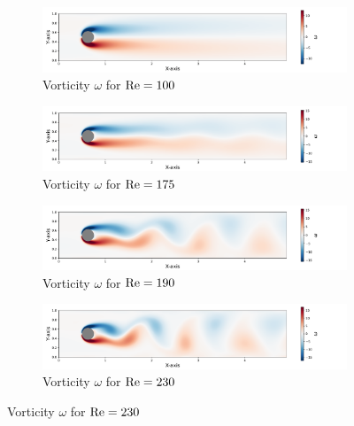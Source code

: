 \begin{figure}[!htb]
    \centering
    \hspace*{0.7cm}
    \begin{subfigure}[b]{\linewidth} %
        \includegraphics[width=\linewidth]{0_graphics/numeric/RE100_30_sim.pdf}
        \caption{Vorticity $\omega$ for $\mathrm{Re} = 100$}
        \label{fig:RE100_vor_40}
    \end{subfigure}

    \hspace*{0.7cm}
    \begin{subfigure}[b]{\linewidth} %
        \includegraphics[width=\linewidth]{0_graphics/numeric/RE175_30_sim.pdf}
        \caption{Vorticity $\omega$ for $\mathrm{Re} = 175$}
        \label{fig:RE175_vor_40}
    \end{subfigure}

        \hspace*{0.7cm}
    \begin{subfigure}[b]{\linewidth} %
        \includegraphics[width=\linewidth]{0_graphics/numeric/RE190_30_sim.pdf}
        \caption{Vorticity $\omega$ for $\mathrm{Re} = 190$}
        \label{fig:RE190_vor_40}
    \end{subfigure}

        \hspace*{0.7cm}
    \begin{subfigure}[b]{\linewidth} %
        \includegraphics[width=\linewidth]{0_graphics/numeric/RE230_30_sim.pdf} 
        \caption{Vorticity $\omega$ for $\mathrm{Re} = 230$}
        \label{fig:RE230_vor_40}
    \end{subfigure}


\end{figure}
